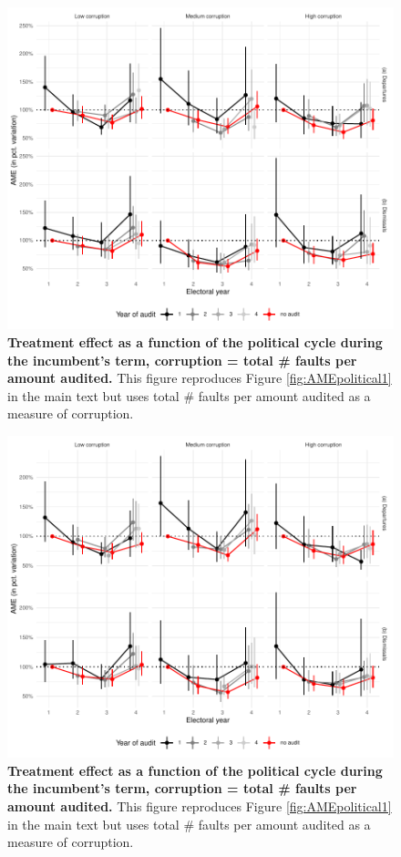 { \begin{figure}[H]
    \centering
    \includegraphics{chapters/chapter_2/figures/AMEpoliticalAllPerAMount_term1Client.pdf}
    \caption{{\bf Treatment effect as a function of the political cycle during the incumbent's term, corruption = total \# faults per amount audited.} This figure reproduces Figure \ref{fig:AMEpolitical1} in the main text but uses total \# faults per amount audited as a measure of corruption.}
    \label{fig:AMEpolitical1_allPerAmount}
\end{figure}

\begin{figure}[H]
    \centering
    \includegraphics{chapters/chapter_2/figures/AMEpoliticalSeriousPerAmount_term1Client.pdf}
    \caption{{\bf Treatment effect as a function of the political cycle during the incumbent's term, corruption = total \# faults per amount audited.} This figure reproduces Figure \ref{fig:AMEpolitical1} in the main text but uses total \# faults per amount audited as a measure of corruption.}
    \label{fig:AMEpolitical1_seriousPerAmount}
\end{figure}

}

